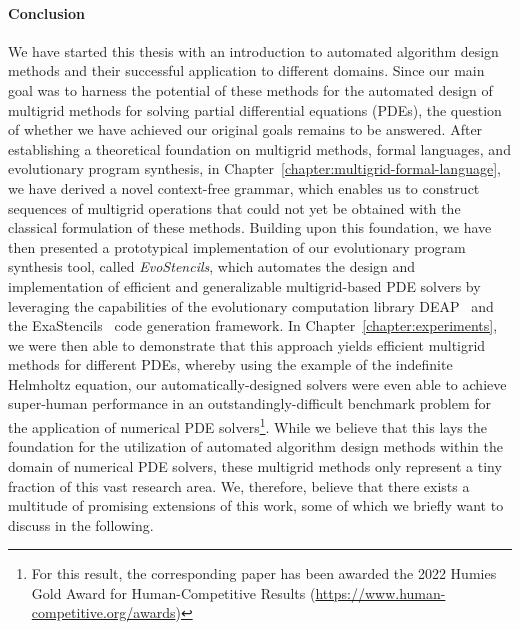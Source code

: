 \paragraph{Conclusion}
We have started this thesis with an introduction to automated algorithm design methods and their successful application to different domains.
Since our main goal was to harness the potential of these methods for the automated design of multigrid methods for solving partial differential equations (PDEs), the question of whether we have achieved our original goals remains to be answered.
After establishing a theoretical foundation on multigrid methods, formal languages, and evolutionary program synthesis, in Chapter~\ref{chapter:multigrid-formal-language}, we have derived a novel context-free grammar, which enables us to construct sequences of multigrid operations that could not yet be obtained with the classical formulation of these methods.
Building upon this foundation, we have then presented a prototypical implementation of our evolutionary program synthesis tool, called \emph{EvoStencils}, which automates the design and implementation of efficient and generalizable multigrid-based PDE solvers by leveraging the capabilities of the evolutionary computation library DEAP~\cite{rainville2012deap} and the ExaStencils~\cite{lengauer2020exastencils} code generation framework.
In Chapter~\ref{chapter:experiments}, we were then able to demonstrate that this approach yields efficient multigrid methods for different PDEs, whereby using the example of the indefinite Helmholtz equation, our automatically-designed solvers were even able to achieve super-human performance in an outstandingly-difficult benchmark problem for the application of numerical PDE solvers\footnote{For this result, the corresponding paper has been awarded the 2022 Humies Gold Award for Human-Competitive Results (\url{https://www.human-competitive.org/awards})}.
While we believe that this lays the foundation for the utilization of automated algorithm design methods within the domain of numerical PDE solvers, these multigrid methods only represent a tiny fraction of this vast research area.
We, therefore, believe that there exists a multitude of promising extensions of this work, some of which we briefly want to discuss in the following. 
